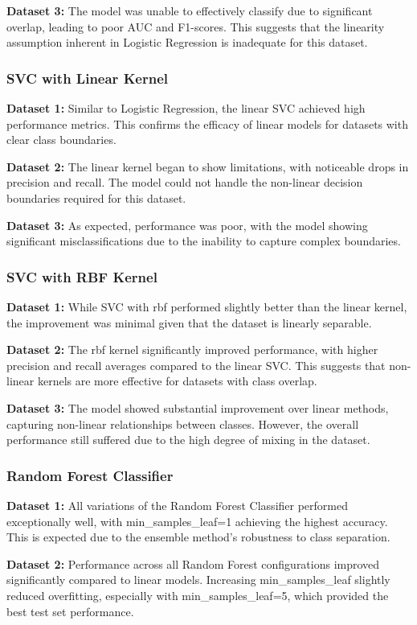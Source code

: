 \textbf{Dataset 3:} The model was unable to effectively classify due to significant overlap, leading to poor AUC and F1-scores. This suggests that the linearity assumption inherent in Logistic Regression is inadequate for this dataset.

\subsubsection*{SVC with Linear Kernel}
\textbf{Dataset 1:} Similar to Logistic Regression, the linear SVC achieved high performance metrics. This confirms the efficacy of linear models for datasets with clear class boundaries.

\textbf{Dataset 2:} The linear kernel began to show limitations, with noticeable drops in precision and recall. The model could not handle the non-linear decision boundaries required for this dataset.

\textbf{Dataset 3:} As expected, performance was poor, with the model showing significant misclassifications due to the inability to capture complex boundaries.

\subsubsection*{SVC with RBF Kernel}
\textbf{Dataset 1:} While SVC with rbf performed slightly better than the linear kernel, the improvement was minimal given that the dataset is linearly separable.

\textbf{Dataset 2:} The rbf kernel significantly improved performance, with higher precision and recall averages compared to the linear SVC. This suggests that non-linear kernels are more effective for datasets with class overlap.

\textbf{Dataset 3:} The model showed substantial improvement over linear methods, capturing non-linear relationships between classes. However, the overall performance still suffered due to the high degree of mixing in the dataset.

\subsubsection*{Random Forest Classifier}
\textbf{Dataset 1:} All variations of the Random Forest Classifier performed exceptionally well, with min\_samples\_leaf=1 achieving the highest accuracy. This is expected due to the ensemble method's robustness to class separation.

\textbf{Dataset 2:} Performance across all Random Forest configurations improved significantly compared to linear models. Increasing min\_samples\_leaf slightly reduced overfitting, especially with min\_samples\_leaf=5, which provided the best test set performance.

